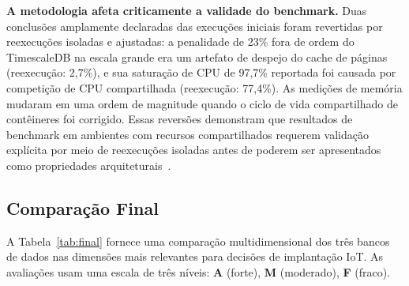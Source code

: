\textbf{A metodologia afeta criticamente a validade do benchmark.}
Duas conclusões amplamente declaradas das execuções iniciais foram revertidas por reexecuções
isoladas e ajustadas: a penalidade de 23\% fora de ordem do TimescaleDB na escala grande era
um artefato de despejo do cache de páginas (reexecução: 2,7\%), e sua saturação de CPU de
97,7\% reportada foi causada por competição de CPU compartilhada (reexecução: 77,4\%). As
medições de memória mudaram em uma ordem de magnitude quando o ciclo de vida compartilhado
de contêineres foi corrigido. Essas reversões demonstram que resultados de benchmark em
ambientes com recursos compartilhados requerem validação explícita por meio de reexecuções
isoladas antes de poderem ser apresentados como propriedades arquiteturais~\citep{shapira2016pitfalls}.

\subsection{Comparação Final}

A Tabela~\ref{tab:final} fornece uma comparação multidimensional dos três bancos de dados
nas dimensões mais relevantes para decisões de implantação IoT. As avaliações usam uma escala
de três níveis: \textbf{A} (forte), \textbf{M} (moderado), \textbf{F} (fraco).

